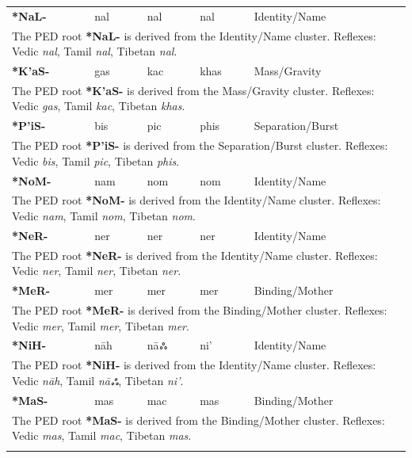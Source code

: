 \begin{longtable}{p{} p{} p{} p{} p{}}
\textbf{*NaL-} & nal & nal & nal & Identity/Name \\ 
\multicolumn{5}{p{\textwidth}}{\small The PED root \textbf{*NaL-} is derived from the Identity/Name cluster. Reflexes: Vedic \textit{nal}, Tamil \textit{nal}, Tibetan \textit{nal}. } \\ \addlinespace 
\textbf{*K'aS-} & gas & kac & khas & Mass/Gravity \\ 
\multicolumn{5}{p{\textwidth}}{\small The PED root \textbf{*K'aS-} is derived from the Mass/Gravity cluster. Reflexes: Vedic \textit{gas}, Tamil \textit{kac}, Tibetan \textit{khas}. } \\ \addlinespace 
\textbf{*P'iS-} & bis & pic & phis & Separation/Burst \\ 
\multicolumn{5}{p{\textwidth}}{\small The PED root \textbf{*P'iS-} is derived from the Separation/Burst cluster. Reflexes: Vedic \textit{bis}, Tamil \textit{pic}, Tibetan \textit{phis}. } \\ \addlinespace 
\textbf{*NoM-} & nam & nom & nom & Identity/Name \\ 
\multicolumn{5}{p{\textwidth}}{\small The PED root \textbf{*NoM-} is derived from the Identity/Name cluster. Reflexes: Vedic \textit{nam}, Tamil \textit{nom}, Tibetan \textit{nom}. } \\ \addlinespace 
\textbf{*NeR-} & ner & ner & ner & Identity/Name \\ 
\multicolumn{5}{p{\textwidth}}{\small The PED root \textbf{*NeR-} is derived from the Identity/Name cluster. Reflexes: Vedic \textit{ner}, Tamil \textit{ner}, Tibetan \textit{ner}. } \\ \addlinespace 
\textbf{*MeR-} & mer & mer & mer & Binding/Mother \\ 
\multicolumn{5}{p{\textwidth}}{\small The PED root \textbf{*MeR-} is derived from the Binding/Mother cluster. Reflexes: Vedic \textit{mer}, Tamil \textit{mer}, Tibetan \textit{mer}. } \\ \addlinespace 
\textbf{*NiH-} & nāh & nāஃ & ni' & Identity/Name \\ 
\multicolumn{5}{p{\textwidth}}{\small The PED root \textbf{*NiH-} is derived from the Identity/Name cluster. Reflexes: Vedic \textit{nāh}, Tamil \textit{nāஃ}, Tibetan \textit{ni'}. } \\ \addlinespace 
\textbf{*MaS-} & mas & mac & mas & Binding/Mother \\ 
\multicolumn{5}{p{\textwidth}}{\small The PED root \textbf{*MaS-} is derived from the Binding/Mother cluster. Reflexes: Vedic \textit{mas}, Tamil \textit{mac}, Tibetan \textit{mas}. } \\ \addlinespace 

\end{longtable}
